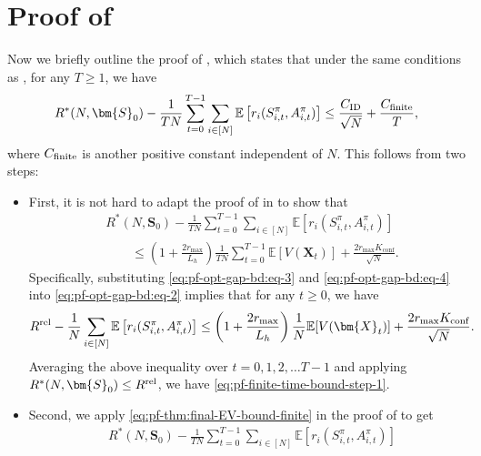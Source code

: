 \documentclass{article}
\theoremstyle{plain}
\theoremstyle{remark}
\newcommand{\E}[1]{\mathbb{E}\left[#1\right]}
\newcommand{\rel}{\textup{rel}} %
\newcommand{\ravg}{R}
\newcommand{\rrel}{\ravg^\rel}
\newcommand{\ID}{\textnormal{ID}}
\newcommand{\finite}{\textnormal{finite}}
\begin{document}
\section{Proof of }
\label{app:finite-time-bound-pf}
    Now we briefly outline the proof of , which states that under the same conditions as , for any $T\geq 1$, we have
    \begin{equation}
        \label{eq:prop-finite-time-bound-restate}
        R^*(N, \bm{S}_0) - \frac{1}{TN}\sum_{t=0}^{T-1}\sum_{i\in[N]}\E{r_i(S_{i,t}^\pi, A_{i,t}^\pi)} \leq \frac{C_\ID}{\sqrt{N}} + \frac{C_\finite}{T},
    \end{equation}
    where $C_\finite$ is another positive constant independent of $N$. 
    This follows from two steps:
    \begin{itemize}
    \item First, it is not hard to adapt the proof of  in  to show that
    \begin{equation}
        \label{eq:pf-finite-time-bound-step-1}
        \begin{aligned}
            &R^*(N, \bm{S}_0) - \frac{1}{TN}\sum_{t=0}^{T-1}\sum_{i\in[N]}\E{r_i(S_{i,t}^\pi, A_{i,t}^\pi)} \\ 
            &\qquad \leq \left(1 + \frac{2r_{\max}}{L_h}\right) \frac{1}{T N}\sum_{t=0}^{T-1} \mathbb{E}[V(\bm{X}_t)] + \frac{2r_{\max}K_{\text{conf}}}{\sqrt{N}}.
        \end{aligned}
    \end{equation}
    Specifically, substituting \eqref{eq:pf-opt-gap-bd:eq-3} and 
    \eqref{eq:pf-opt-gap-bd:eq-4} into \eqref{eq:pf-opt-gap-bd:eq-2} implies that for any $t\geq 0$, we have
    \begin{equation}
        \rrel - \frac{1}{N}\sum_{i\in[N]}\E{r_i(S_{i,t}^\pi, A_{i,t}^\pi)}  \leq \left(1 + \frac{2r_{\max}}{L_h}\right) \frac{1}{N} \mathbb{E}[V(\bm{X}_t)] + \frac{2r_{\max}K_{\text{conf}}}{\sqrt{N}}.
    \end{equation}
    Averaging the above inequality over $t=0,1,2,\dots T-1$ and applying $R^*(N, \bm{S}_0) \leq \rrel$, we have \eqref{eq:pf-finite-time-bound-step-1}. 
    \item Second, we apply \eqref{eq:pf-thm:final-EV-bound-finite} in the proof of  to get
    \begin{align}
        \nonumber
            &R^*(N, \bm{S}_0) - \frac{1}{TN}\sum_{t=0}^{T-1}\sum_{i\in[N]}\E{r_i(S_{i,t}^\pi, A_{i,t}^\pi)}\\

\end{align}
\end{itemize}
\end{document}
